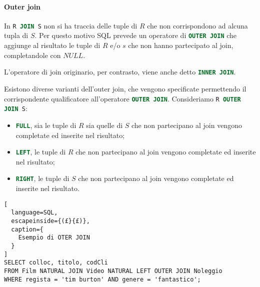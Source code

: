 \paragraph{Outer join}%
\label{par:Outer join}
In \lstinline[language=SQL]{R JOIN S} non si ha traccia delle tuple di $R$ che
non corrispondono ad alcuna tupla di $S$. Per questo motivo SQL prevede un
operatore di \lstinline[language=SQL]{OUTER JOIN} che aggiunge al risultato le
tuple di $R$ e/o $s$ che non hanno partecipato al join, completandole con
$NULL$.

L'operatore di join originario, per contrasto, viene anche detto
\lstinline[language=SQL]{INNER JOIN}.

Esistono diverse varianti dell'outer join, che vengono specificate permettendo
il corrispondente qualificatore all'operatore
\lstinline[language=SQL]{OUTER JOIN}.
Consideriamo \lstinline[language=SQL]{R OUTER JOIN S}:
\begin{itemize}
  \item \lstinline[language=SQL]{FULL}, sia le tuple di $R$ sia quelle di $S$
    che non partecipano al join vengono completate ed inserite nel risultato;
  \item \lstinline[language=SQL]{LEFT}, le tuple di $R$ che non partecipano al
    join vengono completate ed inserite nel risultato;
  \item \lstinline[language=SQL]{RIGHT}, le tuple di $S$ che non partecipano al
    join vengono completate ed inserite nel risultato.
\end{itemize}

\begin{lstlisting}[
  language=SQL,
  escapeinside={(£}{£)},
  caption={
    Esempio di OTER JOIN
  }
]
SELECT colloc, titolo, codCli
FROM Film NATURAL JOIN Video NATURAL LEFT OUTER JOIN Noleggio
WHERE regista = 'tim burton' AND genere = 'fantastico';
\end{lstlisting}

